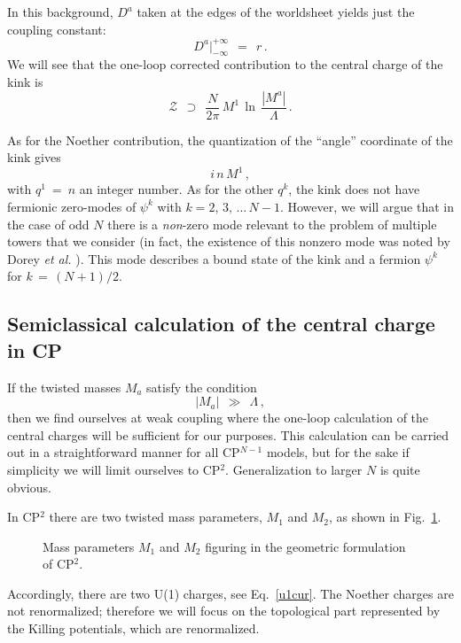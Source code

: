 \documentclass[epsfig,12pt]{article}
\def\beq{\begin{equation}}
\def\eeq{\end{equation}}
\def\beq{\begin{equation}}
\def\eeq{\end{equation}}
\newcommand{\mc}[1]{\mathcal{#1}}
\begin{document}
	In this background, $ D^a $ taken at the edges of the worldsheet yields just the coupling constant:
\beq
	D^a \Big|^{\scriptscriptstyle +\infty}_{\scriptscriptstyle -\infty} ~~=~~    r\,.
\eeq
	We will see that the one-loop corrected contribution to the central charge of the kink is
\beq
       \mc{Z} ~~\supset~~ \frac{N}{2\pi}\, M^1\, \ln\, \frac{   |M^a|   }
                                                            {  \Lambda  }\,.
\eeq

	As for the Noether contribution, the quantization of the ``angle'' coordinate of the kink gives 
\beq
	i\, n\, M^1\,,
\eeq
	with $ q^1 ~=~ n $ an integer number.
	As for the other $ q^k $, the kink does not have fermionic zero-modes of $ \psi^k $ with $ k = 2,\, 3,\, ...\, N-1 $.
	However, we will argue that in the case of odd $ N $ there is a
	{\it non}-zero mode relevant to the problem of multiple towers that we consider (in fact, 
	the existence of this nonzero mode was noted by Dorey {\it et al.} \cite{Dorey:1999zk}).
	This mode describes a bound state of the kink and a fermion $ \psi^k $ for $ k \,=\, (N+1)/2 $.
     
\subsection[Semiclassical calculation of the central charge in CP$^2$]
	{Semiclassical calculation of the central charge in CP}
\label{semclas}
     
	If the twisted masses $M_a$ satisfy the condition
\beq
	| M_a | ~~\gg~~ \Lambda\,,
\eeq
	then we find ourselves at weak coupling where the one-loop calculation of the
	central charges will be sufficient for our purposes. 
	This calculation can be carried out in a straightforward manner for all CP$^{N-1}$ models, 
	but for the sake if simplicity we will limit ourselves to CP$^2$. 
	Generalization to larger $N$ is quite obvious. 
	
	In CP$^2$ there are two twisted mass parameters, $M_1$ and $M_2$, as shown in Fig.~\ref{fM}.
\begin{figure}
\begin{center}
\epsfxsize=5.0cm
\caption{Mass parameters $ M_1 $ and $ M_2 $ figuring in the geometric formulation of CP$^2$.}
\label{fM}
\end{center}
\end{figure}
	Accordingly, there are two U(1) charges, see Eq.~\eqref{u1cur}. 
	The Noether charges are not renormalized; 
	therefore we will focus on the topological part represented by the Killing potentials, 
	which are renormalized. 
\end{document}
